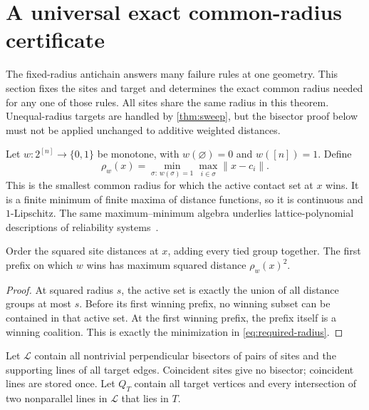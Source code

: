 \section{A universal exact common-radius certificate}
\label{sec:radius}
The fixed-radius antichain answers many failure rules at one geometry. This section fixes the sites and target and determines the exact common radius needed for any one of those rules. All sites share the same radius in this theorem. Unequal-radius targets are handled by \cref{thm:sweep}, but the bisector proof below must not be applied unchanged to additive weighted distances.

Let $w:2^{[n]}\to\{0,1\}$ be monotone, with $w(\varnothing)=0$ and $w([n])=1$. Define
\begin{equation}\label{eq:required-radius}
\rho_w(x)=\min_{\sigma:\,w(\sigma)=1}\max_{i\in\sigma}\|x-c_i\|.
\end{equation}
This is the smallest common radius for which the active contact set at $x$ wins. It is a finite minimum of finite maxima of distance functions, so it is continuous and $1$-Lipschitz. The same maximum--minimum algebra underlies lattice-polynomial descriptions of reliability systems~\cite{lattice,reliability-lattice}.

\begin{lemma}\label{lem:prefix}
Order the squared site distances at $x$, adding every tied group together. The first prefix on which $w$ wins has maximum squared distance $\rho_w(x)^2$.
\end{lemma}
\begin{proof}
At squared radius $s$, the active set is exactly the union of all distance groups at most $s$. Before its first winning prefix, no winning subset can be contained in that active set. At the first winning prefix, the prefix itself is a winning coalition. This is exactly the minimization in \cref{eq:required-radius}.
\end{proof}

Let $\mathscr L$ contain all nontrivial perpendicular bisectors of pairs of sites and the supporting lines of all target edges. Coincident sites give no bisector; coincident lines are stored once. Let $Q_T$ contain all target vertices and every intersection of two nonparallel lines in $\mathscr L$ that lies in $T$.

